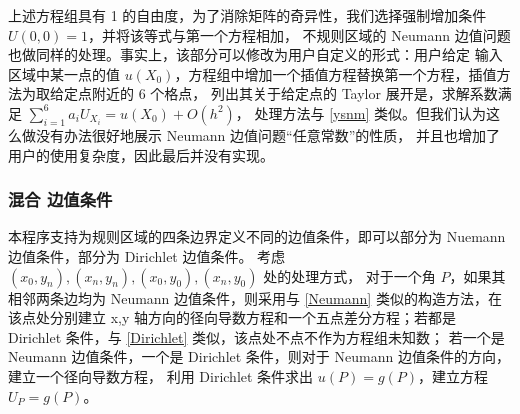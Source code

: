 \documentclass[lang=cn,a4paper,newtx,bibend=bibtex]{elegantpaper}
\begin{document}
上述方程组具有 1 的自由度，为了消除矩阵的奇异性，我们选择强制增加条件 $U(0, 0) = 1$，并将该等式与第一个方程相加，
不规则区域的 Neumann 边值问题也做同样的处理。事实上，该部分可以修改为用户自定义的形式：用户给定
输入区域中某一点的值 $u(X_0)$，方程组中增加一个插值方程替换第一个方程，插值方法为取给定点附近的 6 个格点，
列出其关于给定点的 Taylor 展开是，求解系数满足 $\sum_{i = 1}^6 a_i U_{X_i} = u(X_0) + O(h^2)$，
处理方法与 \ref{ysnm} 类似。但我们认为这么做没有办法很好地展示 Neumann 边值问题“任意常数”的性质，
并且也增加了用户的使用复杂度，因此最后并没有实现。

\subsubsection{混合 边值条件}

本程序支持为规则区域的四条边界定义不同的边值条件，即可以部分为 Nuemann 边值条件，部分为 Dirichlet 边值条件。 
考虑 $(x_0, y_n), (x_n, y_n), (x_0, y_0), (x_n, y_0)$ 处的处理方式，
对于一个角 $P$，如果其相邻两条边均为 Neumann 边值条件，则采用与 \ref{Neumann} 类似的构造方法，在该点处分别建立
x,y 轴方向的径向导数方程和一个五点差分方程；若都是 Dirichlet 条件，与 \ref{Dirichlet} 类似，该点处不点不作为方程组未知数；
若一个是 Neumann 边值条件，一个是 Dirichlet 条件，则对于 Neumann 边值条件的方向，建立一个径向导数方程，
利用 Dirichlet 条件求出 $u(P) = g(P)$，建立方程 $U_P = g(P)$。
\end{document}
